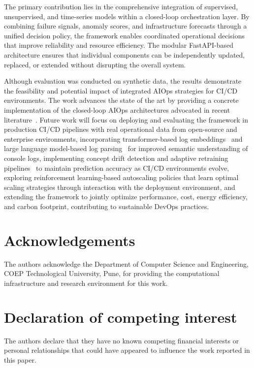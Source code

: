 \documentclass[a4paper,fleqn]{cas-dc}
\begin{document}
The primary contribution lies in the comprehensive integration of supervised, unsupervised, and time-series models within a closed-loop orchestration layer.
By combining failure signals, anomaly scores, and infrastructure forecasts through a unified decision policy, the framework enables coordinated operational decisions that improve reliability and resource efficiency.
The modular FastAPI-based architecture ensures that individual components can be independently updated, replaced, or extended without disrupting the overall system.

Although evaluation was conducted on synthetic data, the results demonstrate the feasibility and potential impact of integrated AIOps strategies for CI/CD environments.
The work advances the state of the art by providing a concrete implementation of the closed-loop AIOps architectures advocated in recent literature~\citep{dang2019aiops, notaro2021aiops, zota2025agentic}.
Future work will focus on deploying and evaluating the framework in production CI/CD pipelines with real operational data from open-source and enterprise environments, incorporating transformer-based log embeddings~\citep{liao2025logtransformer, devlin2019bert} and large language model-based log parsing~\citep{zhou2024logllm} for improved semantic understanding of console logs, implementing concept drift detection and adaptive retraining pipelines~\citep{bayram2025trustworthy, abdullahi2025conceptdrift} to maintain prediction accuracy as CI/CD environments evolve, exploring reinforcement learning-based autoscaling policies that learn optimal scaling strategies through interaction with the deployment environment, and extending the framework to jointly optimize performance, cost, energy efficiency, and carbon footprint, contributing to sustainable DevOps practices.

\section*{Acknowledgements}

The authors acknowledge the Department of Computer Science and Engineering, COEP Technological University, Pune, for providing the computational infrastructure and research environment for this work.

\section*{Declaration of competing interest}

The authors declare that they have no known competing financial interests or personal relationships that could have appeared to influence the work reported in this paper.
\end{document}
